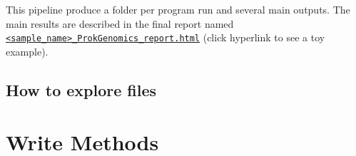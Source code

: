 \documentclass[
]{book}
\begin{document}
This pipeline produce a folder per program run and several main outputs. The main results are described in the final report named \href{report.html}{\texttt{\textless{}sample\_name\textgreater{}\_ProkGenomics\_report.html}} (click hyperlink to see a toy example).

\hypertarget{how-to-explore-files}{%
\section{How to explore files}\label{how-to-explore-files}}

\hypertarget{write-methods}{%
\chapter{Write Methods}\label{write-methods}}
\end{document}
